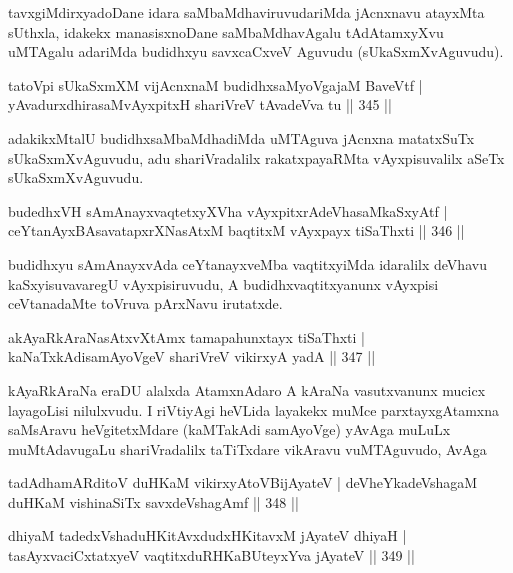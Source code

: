 \begin{artha}
tavxgiMdirxyadoDane idara saMbaMdhaviruvudariMda jAcnxnavu atayxMta sUthxla, idakekx manasisxnoDane saMbaMdhavAgalu tAdAtamxyXvu uMTAgalu adariMda budidhxyu savxcaCxveV Aguvudu (sUkaSxmXvAguvudu).
\end{artha}

\begin{shl}
tatoV\s pi sUkaSxmXM vijAcnxnaM budidhxsaMyoVgajaM BaveVtf |
yAvadurxdhirasaMvAyxpitxH shariVreV tAvadeVva tu \hfill || 345 ||
\end{shl}

\begin{artha}
adakikxMtalU budidhxsaMbaMdhadiMda uMTAguva jAcnxna matatxSuTx sUkaSxmX\-vAguvudu, adu shariVradalilx rakatxpayaRMta vAyxpisuvalilx aSeTx sUkaSxmXvAguvudu.
\end{artha}

\begin{shl}
budedhxVH sAmAnayxvaqtetxyXVha vAyxpitxrAdeVhasaMkaSxyAtf |
ceYtanAyxBAsavatapxrXNasAtxM baqtitxM vAyxpayx tiSaThxti \hfill || 346 ||
\end{shl}

\begin{artha}
budidhxyu sAmAnayxvAda ceYtanayxveMba vaqtitxyiMda idaralilx deVhavu kaSxyisuvavaregU vAyxpisiruvudu, A budidhxvaqtitxyanunx vAyxpisi ceVtanadaMte toVruva pArxNavu irutatxde.
\end{artha}

\begin{shl}
akAyaRkAraNasAtxvXtAmx tamapahunxtayx tiSaThxti |
kaNaTxkAdisamAyoVgeV shariVreV vikirxyA yadA \hfill || 347 ||
\end{shl}

\begin{artha}
kAyaRkAraNa eraDU alalxda AtamxnAdaro A kAraNa vasutxvanunx mucicx laya\-goLisi nilulxvudu. I riVtiyAgi heVLida layakekx muMce parxtayxgAtamxna saMsAravu heVgitetxMdare (kaMTakAdi samAyoVge) yAvAga muLuLx muMtAdavugaLu shariVradalilx taTiTxdare vikAravu vuMTAguvudo, AvAga
\end{artha}

\begin{shl}
tadA\s dhamARditoV duHKaM vikirxyAtoV\s BijAyateV |
deVheYkadeVshagaM duHKaM vishinaSiTx savxdeVshagAmf \hfill || 348 ||
\end{shl}

\begin{shl}
dhiyaM tadedxVshaduHKitAvxdudxHKitavxM jAyateV dhiyaH |
tasAyxvaciCxtatxyeV vaqtitxduRHKaBUteyxYva jAyateV \hfill || 349 ||
\end{shl}

